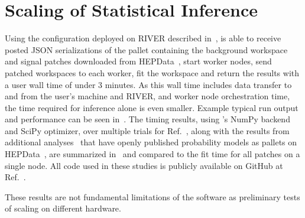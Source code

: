 \section{Scaling of Statistical Inference}\label{sec:results}
%
Using the \funcX{} configuration deployed on RIVER described in~, \funcX{} is able to receive posted JSON serializations of the \pyhf{} pallet containing the background workspace and signal patches downloaded from HEPData~\cite{ATLAS_SUSY_1Lbb_pallet}, start \funcX{} worker nodes, send patched workspaces to each worker, fit the workspace and return the results with a user wall time of under 3 minutes.
As this wall time includes data transfer to and from the user's machine and RIVER, and worker node orchestration time, the time required for inference alone is even smaller.
Example typical run output and performance can be seen in~.
The timing results, using \pyhf{}'s NumPy backend and SciPy optimizer, over multiple trials for Ref.~\cite{ATLAS_SUSY_1Lbb_pallet}, along with the results from additional analyses~\cite{SUSY-2018-09,SUSY-2018-04} that have openly published probability models as \pyhf{} pallets on HEPData~\cite{ATLAS_SUSY_SS3L_pallet,ATLAS_SUSY_staus_pallet}, are summarized in~ and compared to the fit time for all patches on a single node.
All code used in these studies is publicly available on GitHub at Ref.~\cite{study_code}.



These results are not fundamental limitations of the software as preliminary tests of scaling on different hardware.
